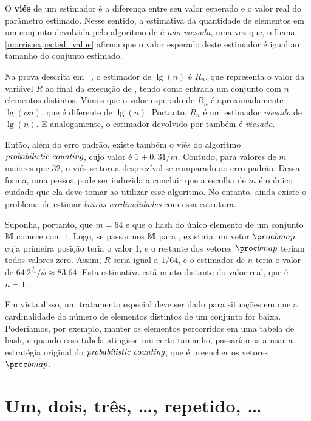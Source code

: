 O \textbf{viés} de um estimador é a diferença entre seu valor esperado e o valor real do parâmetro estimado. 
Nesse sentido, a estimativa da quantidade de elementos em um conjunto devolvida pelo algoritmo de  é 
\textit{não-viesada}, uma vez que, o Lema \ref{morris:expected_value} afirma que o valor esperado deste estimador é 
igual ao tamanho do conjunto estimado.

Na prova descrita em ~\citep{flajolet:martin:85}, o estimador de $\lg(n)$ é $R_n$, que representa o valor da variável 
$R$ ao final da execução de , tendo como entrada um conjunto com $n$ elementos distintos. 
Vimos que o valor esperado de $R_n$ é aproximadamente $\lg(\phi n)$, que é diferente de $\lg(n)$. Portanto, $R_n$ é um 
estimador \textit{viesado} de $\lg(n)$. E analogamente, o estimador devolvido por  também 
é \textit{viesado}.  

Então, além do erro padrão, existe também o viés do algoritmo $\textit{probabilistic counting}$, cujo valor é $1 + 0{,}31/m$. Contudo, para 
valores de $m$ maiores que $32$, o viés se torna desprezíval se comparado ao erro padrão. Dessa forma, uma pessoa pode 
ser induzida a concluir que a escolha de $m$ é o único cuidado que ela deve tomar ao utilizar esse algoritmo. No 
entanto, ainda existe o problema de estimar \textit{baixas cardinalidades} com essa estrutura.

Suponha, portanto, que $m = 64$ e que o hash do único elemento de um conjunto $\mathbb{M}$ comece com $1$. Logo, se passarmos 
$\mathbb{M}$ para , existiria um vetor $\bitmap$ cuja primeira posição teria o valor $1$, e o 
restante dos vetores $\bitmap$ teriam todos valores zero. Assim, $\bar{R}$ seria igual a $1/64$, e o estimador de $n$ 
teria o valor de $64 \ 2^{\frac{1}{64}}/\phi \approx 83.64$. Esta estimativa está muito distante do valor real, que é 
$n = 1$.

Em vista disso, um tratamento especial deve ser dado para situações em que a cardinalidade do número de elementos 
distintos de um conjunto for baixa. Poderíamos, por exemplo, manter os elementos percorridos em uma tabela de hash, e 
quando essa tabela atingisse um certo tamanho, passaríamos a usar a estratégia original do $\textit{probabilistic counting}$, que é preencher
os vetores $\bitmap$.  

\section{Um, dois, três, \dots, repetido, \dots}

